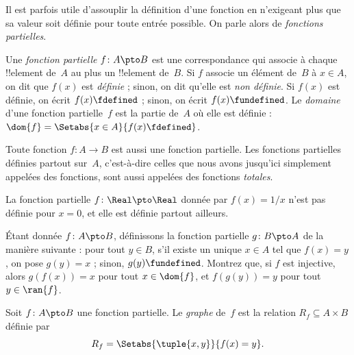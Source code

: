 \documentclass[../../../include/open-logic-section]{subfiles}
\begin{document}


\begin{explain}
Il est parfois utile d’assouplir la définition d’une fonction en
n’exigeant plus que sa valeur soit définie pour toute entrée possible.
On parle alors de \emph{fonctions partielles}.
\end{explain}

\begin{defn}
Une \emph{fonction partielle} $f\colon A \pto B$ est une correspondance
qui associe à chaque !!{element} de~$A$ au plus un !!{element} de~$B$.
Si $f$ associe un élément de~$B$ à $x \in A$, on dit que $f(x)$ est
\emph{définie} ; sinon, on dit qu’elle est \emph{non définie}.
Si $f(x)$ est définie, on écrit $f(x) \fdefined$ ; sinon,
on écrit $f(x) \fundefined$. Le \emph{domaine} d’une fonction
partielle~$f$ est la partie de~$A$ où elle est définie :
$\dom{f} = \Setabs{x \in A}{f(x) \fdefined}$.
\end{defn}

\begin{ex}
Toute fonction $f\colon A \to B$ est aussi une fonction partielle.
Les fonctions partielles définies partout sur~$A$, c’est-à-dire celles
que nous avons jusqu’ici simplement appelées des fonctions, sont aussi
appelées des fonctions \emph{totales}.
\end{ex}

\begin{ex}
La fonction partielle $f\colon \Real \pto \Real$ donnée par $f(x) = 1/x$
n’est pas définie pour $x = 0$, et elle est définie partout ailleurs.
\end{ex}

\begin{prob}
Étant donnée $f\colon A \pto B$, définissons la fonction partielle
$g\colon B \pto A$ de la manière suivante : pour tout $y \in B$,
s’il existe un unique $x \in A$ tel que $f(x) = y$, on pose $g(y) = x$ ;
sinon, $g(y) \fundefined$. Montrez que, si $f$ est injective, alors
$g(f(x)) = x$ pour tout $x \in \dom{f}$, et $f(g(y)) = y$ pour tout
$y \in \ran{f}$.
\end{prob}

\begin{defn}
Soit $f\colon A \pto B$ une fonction partielle. Le \emph{graphe} de~$f$
est la relation $R_f \subseteq A \times B$ définie par
\[
R_f = \Setabs{\tuple{x,y}}{f(x) = y}.
\]
\end{defn}
\end{document}

